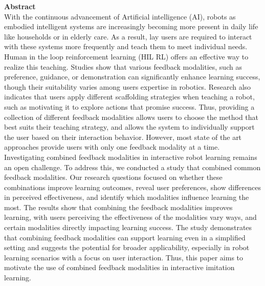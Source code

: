 \documentclass[report.tex]{subfiles}
\begin{document}
\noindent\textbf{Abstract} \\
With the continuous advancement of Artificial intelligence (AI), robots as
embodied intelligent systems are increasingly becoming more present in daily
life like households or in elderly care. As a result, lay users are required
to interact with these systems more frequently and teach them to meet
individual needs. Human in the loop reinforcement learning (HIL RL) offers
an effective way to realize this teaching. Studies show that various feedback
modalities, such as preference, guidance, or demonstration can significantly
enhance learning success, though their suitability varies among users expertise
in robotics. Research also indicates that users apply different scaffolding
strategies when teaching a robot, such as motivating it to explore actions that
promise success. Thus, providing a collection of different feedback modalities
allows users to choose the method that best suits their teaching strategy, and
allows the system to individually support the user based on their interaction
behavior. However, most state of the art approaches provide users with only
one feedback modality at a time. Investigating combined feedback modalities
in interactive robot learning remains an open challenge. To address this,
we conducted a study that combined common feedback modalities. Our
research questions focused on whether these combinations improve learning
outcomes, reveal user preferences, show differences in perceived effectiveness,
and identify which modalities influence learning the most. The results show that
combining the feedback modalities improves learning, with users perceiving
the effectiveness of the modalities vary ways, and certain modalities directly
impacting learning success. The study demonstrates that combining feedback
modalities can support learning even in a simplified setting and suggests the
potential for broader applicability, especially in robot learning scenarios with a
focus on user interaction. Thus, this paper aims to motivate the use of combined
feedback modalities in interactive imitation learning.\\
\end{document}
